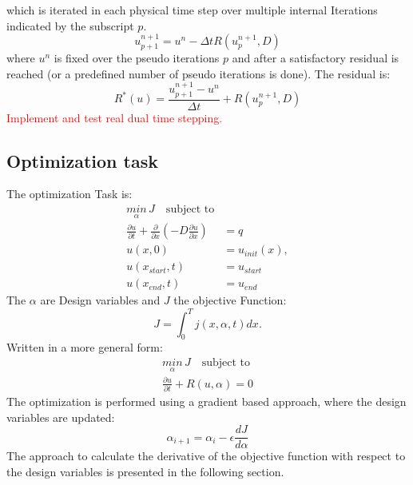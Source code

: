\documentclass[10pt]{article}
\begin{document}
which is iterated in each physical time step over multiple internal Iterations indicated by the subscript $p$.
\begin{equation}
u^{n+1}_{p+1} = u^n - \Delta t R(u^{n+1}_{p},D)
\end{equation} 
where $u^n$ is fixed over the pseudo iterations $p$ and after a satisfactory residual is reached (or a predefined number of pseudo iterations is done). The residual is:
\begin{equation}
R^*(u) = \frac{u^{n+1}_{p+1} - u^n}{\Delta t} +  R(u^{n+1}_{p},D)
\end{equation}
\textcolor{red}{Implement and test real dual time stepping.}
\subsection{Optimization task}
The optimization Task is:
\begin{align}
\underset{\alpha}{min}\,J\quad \text{subject to}\\
\frac{\partial u}{\partial t} +\frac{\partial}{\partial x} \left(- D \frac{\partial u}{\partial x}  \right) &= q \\
u(x,0) &= u_{init}(x), \\
u(x_{start},t)&= u_{start} \\
u(x_{end},t) &= u_{end}
\end{align}
The $\alpha$ are Design variables and $J$ the objective Function:
\begin{equation}
J = \int_{0}^{T} j(x, \alpha, t) dx.
\end{equation}
Written in a more general form:
\begin{align}
\underset{\alpha}{min}\,J\quad \text{subject to}\\
\frac{\partial u}{\partial t} + R\left(u, \alpha \right) = 0
\end{align}
The optimization is performed using a gradient based approach, where the design variables are updated:
\begin{equation}
\alpha_{i+1} = \alpha_i - \epsilon \frac{d J}{d \alpha}
\end{equation}
The approach to calculate the derivative of the objective function with respect to the design variables is presented in the following section.
\end{document}
